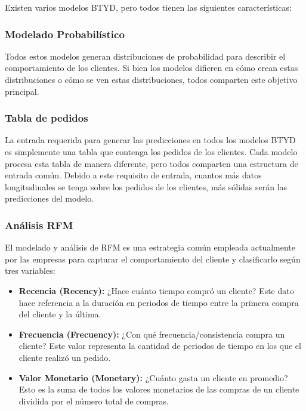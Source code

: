 Existen varios modelos BTYD, pero todos tienen las siguientes características:

\subsubsection{Modelado Probabilístico}

Todos estos modelos generan distribuciones de probabilidad para describir el comportamiento de los clientes. Si bien los modelos difieren en cómo crean estas distribuciones o cómo se ven estas distribuciones, todos comparten este objetivo principal.

\subsubsection{Tabla de pedidos}

La entrada requerida para generar las predicciones en todos los modelos BTYD es simplemente una tabla que contenga los pedidos de los clientes.  Cada modelo procesa esta tabla de manera diferente, pero todos comparten una estructura de entrada común. Debido a este requisito de entrada, cuantos más datos longitudinales se tenga sobre los pedidos de los clientes, más sólidas serán las predicciones del modelo.

\subsubsection{Análisis RFM}

 El modelado y análisis de RFM es una estrategia común empleada actualmente por las empresas para capturar el comportamiento del cliente y clasificarlo según tres variables: 
 
\begin{itemize}
	\item \textbf{Recencia (Recency):} ¿Hace cuánto tiempo compró un cliente? Este dato hace referencia a la duración en periodos de tiempo entre la primera compra del cliente y la última.	
	\item \textbf{Frecuencia (Frecuency):} ¿Con qué frecuencia/consistencia compra un cliente? Este valor representa la cantidad de periodos de tiempo en los que el cliente realizó un pedido.
	\item \textbf{Valor Monetario (Monetary):} ¿Cuánto gasta un cliente en promedio? Esto es la suma de todos los valores monetarios de las compras de un cliente dividida por el número total de compras.
\end{itemize}

